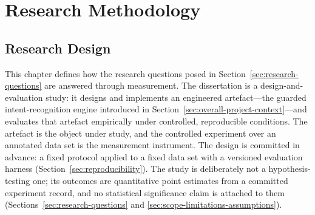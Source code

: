 \chapter{Research Methodology}\label{ch:methodology}

\section{Research Design}\label{sec:research-design}

This chapter defines how the research questions posed in
Section~\ref{sec:research-questions} are answered through measurement. The
dissertation is a design-and-evaluation study: it designs and implements an
engineered artefact---the guarded intent-recognition engine introduced in
Section~\ref{sec:overall-project-context}---and evaluates that artefact
empirically under controlled, reproducible conditions. The artefact is the
object under study, and the controlled experiment over an annotated data set is
the measurement instrument. The design is committed in advance: a fixed protocol
applied to a fixed data set with a versioned evaluation harness
(Section~\ref{sec:reproducibility}). The study is deliberately not a
hypothesis-testing one; its outcomes are quantitative point estimates from a
committed experiment record, and no statistical significance claim is attached
to them (Sections~\ref{sec:research-questions} and
\ref{sec:scope-limitations-assumptions}).


